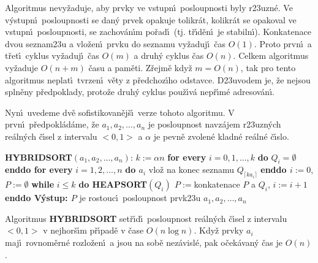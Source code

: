 \documentclass[a4paper,12pt]{article}
\begin{document}
\flushpar Algoritmus nevy\v zaduje, aby prvky ve 
vstupn\'\i\ posloupnosti by\-ly r\accent23uzn\'e. Ve v\'ystupn\'\i\ 
posloupnosti se dan\'y prvek opakuje tolikr\'at, kolikr\'at se 
opakoval ve vstupn\'\i\ posloupnosti, se zachov\'an\'\i m po\v rad\'\i\ 
(tj. t\v r\'\i d\v en\'\i\ je stabiln\'\i ). 
Konkatenace dvou seznam\accent23u a vlo\v zen\'\i\ prvku do seznamu 
vy\v zaduj\'\i\ \v cas $O(1)$. Proto prvn\'\i\ a t\v ret\'\i\ cyklus vy\v zaduj\'\i\ 
\v cas $O(m)$ a druh\'y cyklus \v cas $O(n)$. Celkem 
algoritmus vy\v zaduje $O(n+m)$ \v casu a pam\v eti. Z\v rejm\v e kdy\v z  
$m=O(n)$, tak pro tento algoritmus neplat\'\i\ tvrzen\'\i\ v\v ety z 
p\v redchoz\'\i ho odstavce. 
D\accent23uvodem je, 
\v ze nejsou spln\v eny p\v redpoklady, proto\v ze druh\'y cyklus 
pou\v z\'\i v\'a nep\v r\'\i m\'e adresov\'an\'\i .
\medskip

\flushpar Nyn\'\i\ uvedeme dv\v e sofistikovan\v ej\v s\'\i\ verze tohoto 
algoritmu. V prvn\'\i\ p\v redpokl\'ad\'ame, \v ze 
$a_1,a_2,\dots,a_n$ je posloupnost navz\'ajem r\accent23uzn\'ych re\'aln\'ych 
\v c\'\i sel z intervalu $<0,1>$ a $\alpha$ je pevn\v e zvolen\'e kladn\'e 
re\'aln\'e \v c\'\i slo.
\medskip

{\bf HYBRIDSORT$(a_1,a_2,\dots,a_n)$}:\newline 
$k:=\alpha n$\newline 
{\bf for every} $i=0,1,\dots,k$ {\bf do} $Q_i=\emptyset$ {\bf enddo\newline 
for every} $i=1,2,\dots,n$ {\bf do\newline 
\phantom{{\rm ---}}$a_i$} vlo\v z na konec seznamu $Q_{\lceil ka_
i\rceil}$\newline 
{\bf enddo\newline 
$i:=0$}, $P:=\emptyset$\newline 
{\bf while} $i\le k$ {\bf do\newline 
\phantom{{\rm ---}}HEAPSORT$(Q_i)$
$P:=$}konkatenace $P$ a $Q_i$, $i:=i+1$\newline 
{\bf enddo\newline 
V\'ystup: $P$} je rostouc\'\i\ posloupnost prvk\accent23u 
$a_1,a_2,\dots,a_n$
\bigskip

Algoritmus {\bf HYBRIDSORT} set\v r\'\i d\'\i\ 
posloupnost re\'al\-n\'ych \v c\'\i sel z intervalu $<0,1>$ v 
nejhor\v s\'\i m p\v r\'\i pad\v e v \v case $O(n\log n)$. Kdy\v z prvky $
a_i$ 
maj\'\i\ rovnom\v ern\'e rozlo\v zen\'\i\ a jsou na sob\v e nez\'a\-visl\'e, 
pak o\v cek\'avan\'y \v cas je $O(n)$.
\endproclaim
\medskip
\end{document}
